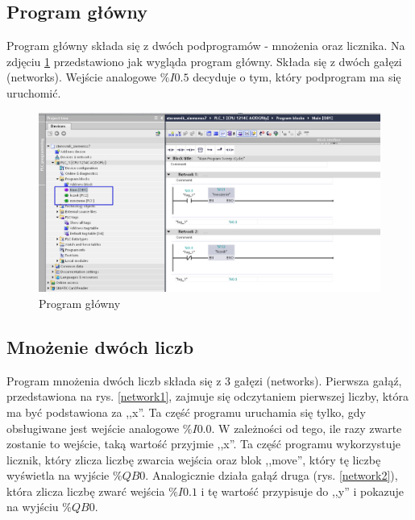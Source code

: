 \documentclass[12pt]{article}
\begin{document}
\subsection{Program główny}
Program główny składa się z dwóch podprogramów - mnożenia oraz licznika. Na zdjęciu \ref{main} przedstawiono jak wygląda program główny. Składa się z dwóch gałęzi (networks). Wejście analogowe $\%I0.5$ decyduje o tym, który podprogram ma się uruchomić.
\begin{figure}[H]
    \centering
    \includegraphics[scale=0.4]{./zdj/main.png}
    \caption{Program główny}
    \label{main}
\end{figure} 

\subsection{Mnożenie dwóch liczb}
Program mnożenia dwóch liczb składa się z 3 gałęzi (networks). Pierwsza gałąź, przedstawiona na rys. \ref{network1}, zajmuje się odczytaniem pierwszej liczby, która ma być podstawiona za ,,x''. Ta część programu uruchamia się tylko, gdy obsługiwane jest wejście analogowe $\%I0.0$. W zależności od tego, ile razy zwarte zostanie to wejście, taką wartość przyjmie ,,x''. Ta część programu wykorzystuje licznik, który zlicza liczbę zwarcia wejścia oraz blok ,,move'', który tę liczbę wyświetla na wyjście $\%QB0$. Analogicznie działa gałąź druga (rys. \ref{network2}), która zlicza liczbę zwarć wejścia $\%I0.1$ i tę wartość przypisuje do ,,y'' i pokazuje na wyjściu $\%QB0$. 
\end{document}
